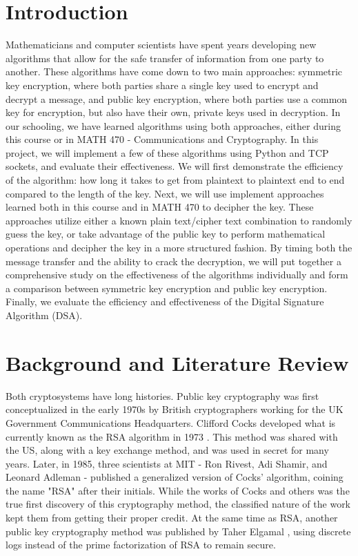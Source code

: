 \documentclass[12pt]{report}
\begin{document}
\section{Introduction}
Mathematicians and computer scientists have spent years developing new algorithms that allow for the safe transfer of information from one party to another.
These algorithms have come down to two main approaches: symmetric key encryption, where both parties share a single key used to encrypt and decrypt a message,
and public key encryption, where both parties use a common key for encryption, but also have their own, private keys used in decryption. In our schooling, we
have learned algorithms using both approaches, either during this course or in MATH 470 - Communications and Cryptography. In this project, we will implement a few
of these algorithms using Python and TCP sockets, and evaluate their effectiveness. We will first demonstrate the efficiency of the algorithm: how long it
takes to get from plaintext to plaintext end to end compared to the length of the key. Next, we will use implement approaches learned both in this course and
in MATH 470 to decipher the key. These approaches utilize either a known plain text/cipher text combination to randomly guess the key, or take advantage of the
public key to perform mathematical operations and decipher the key in a more structured fashion. By timing both the message transfer and the ability to crack the
decryption, we will put together a comprehensive study on the effectiveness of the algorithms individually and form a comparison between symmetric key encryption
and public key encryption. Finally, we evaluate the efficiency and effectiveness of the Digital Signature Algorithm (DSA).

\section{Background and Literature Review}
Both cryptosystems have long histories. Public key cryptography was first conceptualized in the early 1970s by British cryptographers working for the UK Government
Communications Headquarters. Clifford Cocks developed what is currently known as the RSA algorithm in 1973 \cite{class}. This method was shared with the US, along
with a key exchange method, and was used in secret for many years. Later, in 1985, three scientists at MIT - Ron Rivest, Adi Shamir, and Leonard Adleman - published
a generalized version of Cocks' algorithm, coining the name "RSA" after their initials. While the works of Cocks and others was the true first discovery of this
cryptography method, the classified nature of the work kept them from getting their proper credit. At the same time as RSA, another public key cryptography method
was published by Taher Elgamal \cite{elgamal}, using discrete logs instead of the prime factorization of RSA to remain secure.
\end{document}
